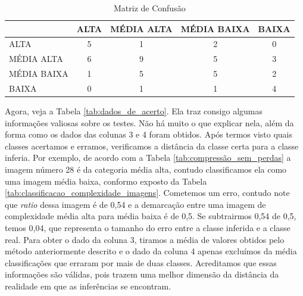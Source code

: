 \begin{table}[htbp]
\centering

\caption{Matriz de Confusão}
\label{tab:matriz_de_confusao}

\begin{tabularx}{\textwidth}{X|C|C|C|C}
    \hline
        
        ~ & ALTA & MÉDIA ALTA & MÉDIA BAIXA & BAIXA \\ \hline
        ALTA & 5 & 1 & 2 & 0 \\ \hline
        MÉDIA ALTA & 6 & 9 & 5 & 3 \\ \hline
        MÉDIA BAIXA & 1 & 5 & 5 & 2 \\ \hline
        BAIXA & 0 & 1 & 1 & 4 \\

    \hline
    
\end{tabularx}

\autoriaPropria

\end{table}

\paragrafo Agora, veja a Tabela \ref{tab:dados_de_acerto}. Ela traz consigo algumas informações valiosas sobre os testes. Não há muito o que explicar nela, além da forma como os dados das colunas 3 e 4 foram obtidos. Após termos visto quais classes acertamos e erramos, verificamos a distância da classe certa para a classe inferia. Por exemplo, de acordo com a Tabela \ref{tab:compressão_sem_perdas} a imagem número 28 é da categoria média alta, contudo classificamos ela como uma imagem média baixa, conformo exposto da Tabela \ref{tab:classificacao_complexidade_imagens}. Cometemos um erro, contudo note que \textit{ratio} dessa imagem é de 0,54 e a demarcação entre uma imagem de complexidade média alta para média baixa é de 0,5. Se subtrairmos 0,54 de 0,5, temos 0,04, que representa o tamanho do erro entre a classe inferida e a classe real.
\paragrafo Para obter o dado da coluna 3, tiramos a média de valores obtidos pelo método anteriormente descrito e o dado da coluna 4 apenas excluímos da média classificações que erraram por mais de duas classes. Acreditamos que essas informações são válidas, pois trazem uma melhor dimensão da distância da realidade em que as inferências se encontram.



